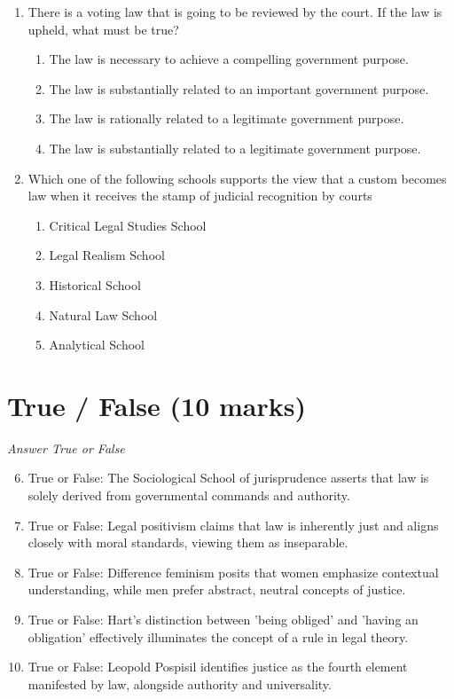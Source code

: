 \documentclass[12pt]{article}
\begin{document}
\begin{enumerate}[label=\arabic*.]
\begin{enumerate}[label=(\alph*)]
\end{enumerate}
\item There is a voting law that is going to be reviewed by the court. If the law is upheld, what must be true?
\begin{enumerate}[label=(\alph*)]
    \item The law is necessary to achieve a compelling government purpose.
    \item The law is substantially related to an important government purpose.
    \item The law is rationally related to a legitimate government purpose.
    \item The law is substantially related to a legitimate government purpose.
\end{enumerate}
\item Which one of the following schools supports the view that a custom becomes law when it receives the stamp of judicial recognition by courts
\begin{enumerate}[label=(\alph*)]
    \item Critical Legal Studies School
    \item Legal Realism School
    \item Historical School
    \item Natural Law School
    \item Analytical School
\end{enumerate}
\end{enumerate}

\section*{True / False (10 marks)}
\textit{Answer True or False}
\begin{enumerate}[label=\arabic*.]
\setcounter{enumi}{5}
\item True or False: The Sociological School of jurisprudence asserts that law is solely derived from governmental commands and authority.
\item True or False: Legal positivism claims that law is inherently just and aligns closely with moral standards, viewing them as inseparable.
\item True or False: Difference feminism posits that women emphasize contextual understanding, while men prefer abstract, neutral concepts of justice.
\item True or False: Hart's distinction between 'being obliged' and 'having an obligation' effectively illuminates the concept of a rule in legal theory.
\item True or False: Leopold Pospisil identifies justice as the fourth element manifested by law, alongside authority and universality.
\end{enumerate}
\end{document}
